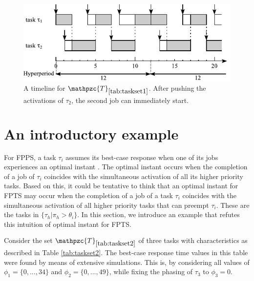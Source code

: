 \documentclass[conference,compsoc]{IEEEtran}
\begin{document}
\begin{figure}[h]
	\centering
	\includegraphics[width=1\linewidth]{fig/fpns2}
	\caption{A timeline for $\mathpzc{T}_{\ref{tab:taskset1}}$. After pushing the activations of $\tau_2$, the second job can immediately start.}
	\label{fig:fpns2}
\end{figure}

\section{An introductory example}

For FPPS, a task $\tau_i$ assumes its best-case response when one of its jobs experiences an optimal instant \cite{BLM13}. The optimal instant occurs when the completion of a job of $\tau_i$ coincides with the simultaneous activation of all its higher priority tasks. Based on this, it could be tentative to think that an optimal instant for FPTS may occur when the completion of a job of a task $\tau_i$ coincides with the simultaneous activation of all higher priority tasks that can preempt $\tau_i$. These are the tasks in $\{\tau_h | \pi_h > \theta_i \}$. In this section, we introduce an example that refutes this intuition of optimal instant for FPTS.


Consider the set $\mathpzc{T}_{\ref{tab:taskset2}}$ of three tasks with characteristics as described in Table \ref{tab:taskset2}. The best-case response time values in this table were found by means of extensive simulations. This is, by considering all values of $\phi_1 = \{0,...,34\}$ and $\phi_2 = \{0,...,49\}$, while fixing the phasing of $\tau_3$ to $\phi_3 = 0$.
\end{document}
